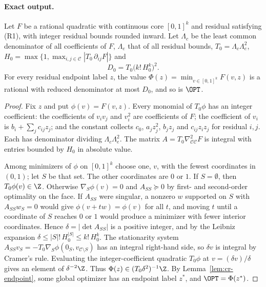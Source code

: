 \paragraph{Exact output.}\label{sec:cr-exact}

\begin{lemma}\label{lem:cr-height}
Let $F$ be a rational quadratic with continuous core $[0,1]^k$ and residual
satisfying (R1), with integer residual bounds rounded inward. Let
$\Lambda_c$ be the least common denominator of all coefficients of $F$,
$\Lambda_e$ that of all residual bounds, $T_0=\Lambda_c\Lambda_e^2$,
$H_0=\max\{1,\max_{i,j\in\mathcal C}|T_0\,\partial_{ij}F|\}$ and
\[
D_0=T_0\bigl(k!\,H_0^k\bigr)^2 .
\]
For every residual endpoint label $z$, the value
$\Phi(z)=\min_{v\in[0,1]^k}F(v,z)$ is a rational with reduced denominator
at most $D_0$, and so is $\OPT$.
\end{lemma}
\begin{proof}
Fix $z$ and put $\phi(v)=F(v,z)$. Every monomial of $T_0\phi$ has an
integer coefficient: the coefficients of $v_iv_j$ and $v_i^2$ are
coefficients of $F$; the coefficient of $v_i$ is $b_i+\sum_jc_{ij}z_j$;
and the constant collects $c_0$, $a_jz_j^2$, $b_jz_j$ and $c_{ij}z_iz_j$
for residual $i,j$. Each has denominator dividing $\Lambda_c\Lambda_e^2$.
The matrix $A=T_0\nabla^2_{\mathcal C\mathcal C}F$ is integral with entries
bounded by $H_0$ in absolute value.

Among minimizers of $\phi$ on $[0,1]^k$ choose one, $v$, with the fewest
coordinates in $(0,1)$; let $S$ be that set. The other coordinates are
$0$ or $1$. If $S=\emptyset$, then $T_0\phi(v)\in\Z$. Otherwise
$\nabla_S\phi(v)=0$ and $A_{SS}\succeq0$ by first- and second-order
optimality on the face. If $A_{SS}$ were singular, a nonzero $w$
supported on $S$ with $A_{SS}w_S=0$ would give $\phi(v+tw)=\phi(v)$ for all
$t$, and moving $t$ until a coordinate of $S$ reaches $0$ or $1$ would
produce a minimizer with fewer interior coordinates. Hence
$\delta=|\det A_{SS}|$ is a positive integer, and by the Leibniz expansion
$\delta\le|S|!\,H_0^{|S|}\le k!\,H_0^k$. The stationarity system
$A_{SS}v_S=-T_0\nabla_S\phi(0_S,v_{\mathcal C\setminus S})$ has an integral
right-hand side, so $\delta v$ is integral by Cramer's rule. Evaluating
the integer-coefficient quadratic $T_0\phi$ at $v=(\delta v)/\delta$ gives
an element of $\delta^{-2}\Z$. Thus $\Phi(z)\in(T_0\delta^2)^{-1}\Z$.
By Lemma~\ref{lem:cr-endpoint}, some global optimizer has an endpoint
label $z^*$, and $\OPT=\Phi(z^*)$.
\end{proof}

